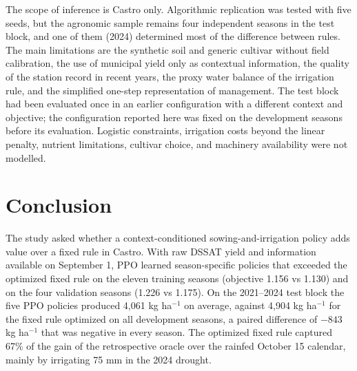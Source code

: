 \documentclass[times,final,authoryear]{elsarticle}
\begin{document}
The scope of inference is Castro only. Algorithmic replication was tested with five seeds, but the agronomic sample remains four independent seasons in the test block, and one of them (2024) determined most of the difference between rules. The main limitations are the synthetic soil and generic cultivar without field calibration, the use of municipal yield only as contextual information, the quality of the station record in recent years, the proxy water balance of the irrigation rule, and the simplified one-step representation of management. The test block had been evaluated once in an earlier configuration with a different context and objective; the configuration reported here was fixed on the development seasons before its evaluation. Logistic constraints, irrigation costs beyond the linear penalty, nutrient limitations, cultivar choice, and machinery availability were not modelled.

\section{Conclusion}
\label{conclusao}

The study asked whether a context-conditioned sowing-and-irrigation policy adds value over a fixed rule in Castro. With raw DSSAT yield and information available on September 1, PPO learned season-specific policies that exceeded the optimized fixed rule on the eleven training seasons (objective 1.156 vs 1.130) and on the four validation seasons (1.226 vs 1.175). On the 2021--2024 test block the five PPO policies produced 4,061 kg ha$^{-1}$ on average, against 4,904 kg ha$^{-1}$ for the fixed rule optimized on all development seasons, a paired difference of $-843$ kg ha$^{-1}$ that was negative in every season. The optimized fixed rule captured 67\% of the gain of the retrospective oracle over the rainfed October 15 calendar, mainly by irrigating 75 mm in the 2024 drought.
\end{document}
